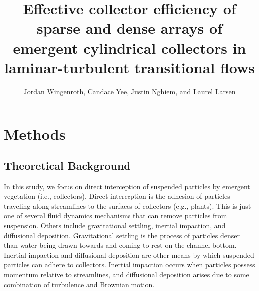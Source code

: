 \documentclass{scrreprt}
\author{Jordan Wingenroth, Candace Yee, Justin Nghiem, and Laurel Larsen}
\title{Effective collector efficiency of sparse and dense arrays of emergent cylindrical collectors in laminar-turbulent transitional flows}
\newcommand\Rey{\mathrm{Re}}
\begin{document}
\maketitle

%
%
%
%
%
%

\setcounter{chapter}{1}

\chapter{Methods}

\section{Theoretical Background}

In this study, we focus on direct interception of suspended particles by emergent vegetation (i.e., collectors). Direct interception is the adhesion of particles traveling along streamlines to the surfaces of collectors (e.g., plants). This is just one of several fluid dynamics mechanisms that can remove particles from suspension. Others include gravitational settling, inertial impaction, and diffusional deposition. Gravitational settling is the process of particles denser than water being drawn towards and coming to rest on the channel bottom. Inertial impaction and diffusional deposition are other means by which suspended particles can adhere to collectors. Inertial impaction occurs when particles possess momentum relative to streamlines, and diffusional deposition arises due to some combination of turbulence and Brownian motion.
\end{document}
